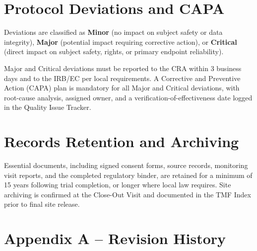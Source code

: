 \documentclass[11pt,a4paper]{scrreprt}
\begin{document}
\section{Protocol Deviations and CAPA}

Deviations are classified as \textbf{Minor} (no impact on subject safety or data integrity),
\textbf{Major} (potential impact requiring corrective action), or \textbf{Critical}
(direct impact on subject safety, rights, or primary endpoint reliability).

\begin{tcolorbox}[colback=soplight, colframe=sopnavy, boxrule=0.6pt, arc=2pt,
  left=8pt, right=8pt, top=6pt, bottom=6pt,
  title={\faClipboardList\ \ Reporting and CAPA Requirement}, coltitle=white,
  colbacktitle=sopnavy, fonttitle=\bfseries\small]
\small
Major and Critical deviations must be reported to the CRA within 3 business days and to the
IRB/EC per local requirements. A Corrective and Preventive Action (CAPA) plan is mandatory
for all Major and Critical deviations, with root-cause analysis, assigned owner, and a
verification-of-effectiveness date logged in the Quality Issue Tracker.
\end{tcolorbox}

\section{Records Retention and Archiving}

Essential documents, including signed consent forms, source records, monitoring visit reports,
and the completed regulatory binder, are retained for a minimum of 15 years following trial
completion, or longer where local law requires. Site archiving is confirmed at the Close-Out
Visit and documented in the TMF Index prior to final site release.

\vspace{0.6cm}
\noindent{\color{sopline}\rule{\linewidth}{0.8pt}}
\vspace{0.4cm}

\section*{Appendix A -- Revision History}
\end{document}
